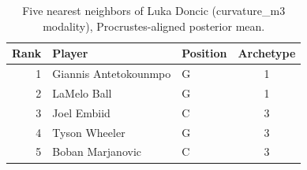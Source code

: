 \begin{table}[htbp]
  \centering\small
  \begin{tabular}{rllc}
    \toprule
    Rank & Player & Position & Archetype \\
    \midrule
    1 & Giannis Antetokounmpo & G & 1 \\
    2 & LaMelo Ball & G & 1 \\
    3 & Joel Embiid & C & 3 \\
    4 & Tyson Wheeler & G & 3 \\
    5 & Boban Marjanovic & C & 3 \\
    \bottomrule
  \end{tabular}
  \caption{Five nearest neighbors of Luka Doncic (curvature_m3 modality), Procrustes-aligned posterior mean.}
  \label{tab:Luka_Doncic_neighbors_curvature_m3}
\end{table}

